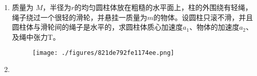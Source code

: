 
\begin{enumerate}
\item 质量为 $M$，半径为$r$的均匀圆柱体放在粗糙的水平面上，柱的外围绕有轻绳，绳子绕过一个很轻的滑轮，并悬挂一质量为$m $的物体。设圆柱只滚不滑，并且圆柱体与滑轮间的绳子是水平的，求圆柱体质心加速度$ a_1$、物体的加速度$ a_2$、及绳中张力T。
\begin{figure}[ht]
\centering
\texttt{[image: ./figures/821de792fe1174ee.png]}
\caption{} \label{fig_SD05_1}
\end{figure}
\item 
\end{enumerate}